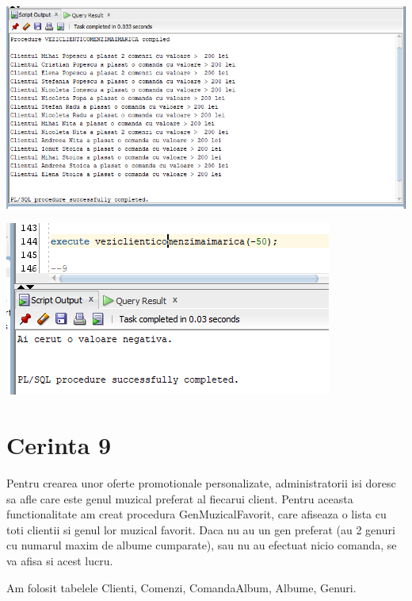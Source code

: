 \documentclass{article}
\begin{document}
\vspace{0.5cm}

\includegraphics[width=\textwidth]{8.png}

\includegraphics[width=\textwidth]{aaa.png}

\newpage
\section{Cerinta 9}
Pentru crearea unor oferte promotionale personalizate, administratorii isi doresc sa afle care este genul muzical preferat al fiecarui client. Pentru aceasta functionalitate am creat procedura GenMuzicalFavorit, care afiseaza o lista cu toti clientii si genul lor muzical favorit. Daca nu au un gen preferat (au 2 genuri cu numarul maxim de albume cumparate), sau nu au efectuat nicio comanda, se va afisa si acest lucru.

Am folosit tabelele Clienti, Comenzi, ComandaAlbum, Albume, Genuri.
\end{document}
